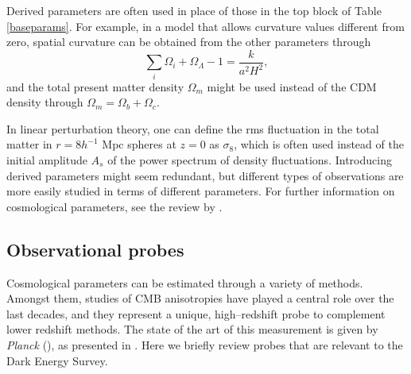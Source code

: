 Derived parameters are often used in place of those in the top block of Table \ref{baseparams}. For example, in a model that allows curvature values different from zero, spatial curvature can be obtained from the other parameters through
\begin{equation}
\sum_i\Omega_i+\Omega_{\Lambda}-1=\frac{k}{a^2H^2},
\end{equation}
and the total present matter density $\Omega_m$ might be used instead of the CDM density through $\Omega_m=\Omega_b+\Omega_c$.

In linear perturbation theory, one can define the rms fluctuation in the total matter in $r=8 h^{-1}$ Mpc spheres at $z=0$ as $\sigma_8$, which is often used instead of the initial amplitude $A_s$ of the power spectrum of density fluctuations. 
Introducing derived parameters might seem redundant, but different types of observations are more easily studied in terms of different parameters. For further information on cosmological parameters, see the review by \citet{LahavRev}.


\subsection{Observational probes}

Cosmological parameters can be estimated through a variety of methods. Amongst them, studies of CMB anisotropies have played a central role over the last decades, and they represent a unique, high--redshift probe to complement lower redshift methods. The state of the art of this measurement is given by \emph{Planck} (\citealt{planckI}), as presented in \citet{planck16}. Here we briefly review probes that are relevant to the Dark Energy Survey.

